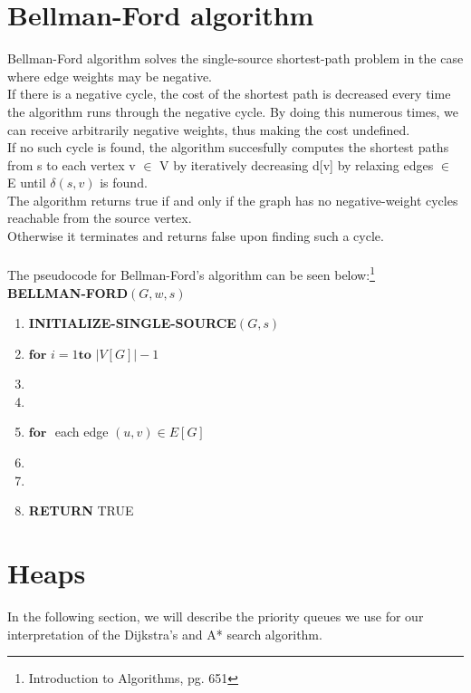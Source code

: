 \documentclass[11pt]{article}
\begin{document}
\section{Bellman-Ford algorithm}
Bellman-Ford algorithm solves the single-source shortest-path problem in the case where edge weights may be negative.\\
If there is a negative cycle, the cost of the shortest path is decreased every time the algorithm runs through the negative cycle. By doing this numerous times, we can receive arbitrarily negative weights, thus making the cost undefined.\\
If no such cycle is found, the algorithm succesfully computes the shortest paths from s to each vertex v $\in$ V by iteratively decreasing d[v] by relaxing edges $\in$ E until $\delta(s,v)$ is found.\\
The algorithm returns true if and only if the graph has no negative-weight cycles reachable from the source vertex.\\
Otherwise it terminates and returns false upon finding such a cycle.\\\\
The pseudocode for Bellman-Ford's algorithm can be seen below:\footnote{Introduction to Algorithms, pg. 651}\\

\textbf{BELLMAN-FORD$(G, w, s)$}
\begin{enumerate}
\setlength\itemsep{0em}
\item \textbf{INITIALIZE-SINGLE-SOURCE}$(G, s)$
\item $\textbf{for } i = 1 \textbf{to } |V[G]| -1$
\item {}
\item \tab{}
\item $\textbf{for }$ each edge $(u,v) \in E[G]$
\item {}
\item \tab{}
\item \textbf{RETURN } TRUE
\end{enumerate}




\section{Heaps}
In the following section, we will describe the priority queues we use for our interpretation of the Dijkstra's and A* search algorithm.\\
\end{document}
